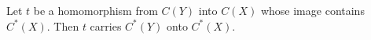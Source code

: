 Let $t$ be a homomorphism from $C(Y)$ into $C(X)$ whose image contains $C^*(X)$. Then $t$ carries $C^*(Y)$ onto $C^*(X)$.
